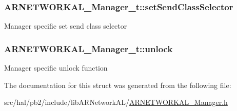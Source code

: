 \subsubsection[{\texorpdfstring{set\+Send\+Class\+Selector}{setSendClassSelector}}]{ A\+R\+N\+E\+T\+W\+O\+R\+K\+A\+L\+\_\+\+Manager\+\_\+t\+::set\+Send\+Class\+Selector}\hypertarget{struct_a_r_n_e_t_w_o_r_k_a_l___manager__t_a400452281f96922451dd7fc08a2a06d6}{}\label{struct_a_r_n_e_t_w_o_r_k_a_l___manager__t_a400452281f96922451dd7fc08a2a06d6}
Manager specific set send class selector 
\subsubsection[{\texorpdfstring{unlock}{unlock}}]{ A\+R\+N\+E\+T\+W\+O\+R\+K\+A\+L\+\_\+\+Manager\+\_\+t\+::unlock}\hypertarget{struct_a_r_n_e_t_w_o_r_k_a_l___manager__t_a7f6b9075bf58e6361b5c7efff6c73ea6}{}\label{struct_a_r_n_e_t_w_o_r_k_a_l___manager__t_a7f6b9075bf58e6361b5c7efff6c73ea6}
Manager specific unlock function 

The documentation for this struct was generated from the following file\+:\begin{DoxyCompactItemize}
\item 
src/hal/pb2/include/lib\+A\+R\+Network\+A\+L/\hyperlink{_a_r_n_e_t_w_o_r_k_a_l___manager_8h}{A\+R\+N\+E\+T\+W\+O\+R\+K\+A\+L\+\_\+\+Manager.\+h}\end{DoxyCompactItemize}
